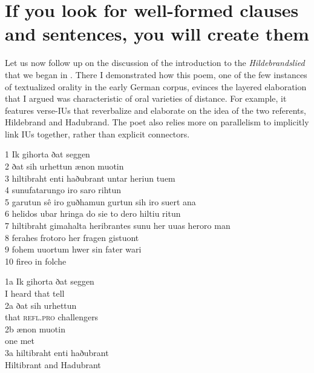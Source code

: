 \section{If you look for well-formed clauses and sentences, you will create them}\label{sec:7.3}

Let us now follow up on the discussion of the introduction to the \textit{Hildebrandslied} that we began in . There I demonstrated how this poem, one of the few instances of textualized orality in the early German corpus, evinces the layered elaboration that I argued was characteristic of oral varieties of distance. For example, it features verse-IUs that reverbalize and elaborate on the idea of the two referents, Hildebrand and Hadubrand. The poet also relies more on parallelism to implicitly link IUs together, rather than explicit connectors.

\ea%
    \label{ex:7:12}
1  \tab Ik gihorta ðat seggen\\
2  \tab ðat sih urhettun    \qquad    ænon muotin\\
3  \tab hiltibraht enti haðubrant   \qquad     untar heriun tuem\\
4  \tab sunufatarungo  \qquad      iro saro rihtun\\
5  \tab garutun sê iro guðhamun   \qquad     gurtun sih iro suert ana\\
6  \tab helidos ubar hringa   \qquad     do sie to dero hiltiu ritun\\
7  \tab hiltibraht gimahalta heribrantes sunu    \qquad    her uuas heroro man\\
8  \tab ferahes frotoro  \qquad      her fragen gistuont\\
9  \tab fohem uuortum   \qquad     hwer sin fater wari\\
10 \tab fireo in folche\\\medskip

1a \tab \gll Ik  gihorta  ðat  seggen\\
        I  heard   that  tell\\

2a \tab \gll ðat     sih       urhettun\\
        that   \textsc{refl.pro}   challengers\\

2b \tab \gll ænon   muotin\\
        one     met\\

3a \tab \gll hiltibraht  enti    haðubrant\\
        Hiltibrant   and    Hadubrant\\

